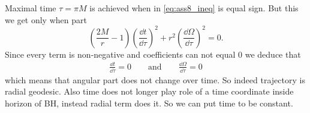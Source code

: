 Maximal time $\tau = \pi M$ is achieved when in \cref{eq:ass8_ineq} is equal
sign. But this we get only when part
%
\begin{equation}
    \left(\frac{2M}{r}-1\right) \left(\frac{\dd t}{\dd \tau}\right)^2  +
    r^2 \left(\frac{\dd \Omega}{\dd \tau}\right)^2 = 0.
\end{equation}
%
Since every term is non-negative and coefficients can not equal $0$ we deduce that
%
\begin{align}
    \boxed{\frac{\dd t}{\dd \tau} = 0 \qquad \text{and} \qquad \frac{\dd \Omega}{\dd \tau} = 0}
\end{align}
%
which means that angular part does not change over time. So indeed trajectory is
radial geodesic. Also time does not longer play role of a time coordinate inside
horizon of BH, instead radial term does it. So we can put time to be constant.

\problem

